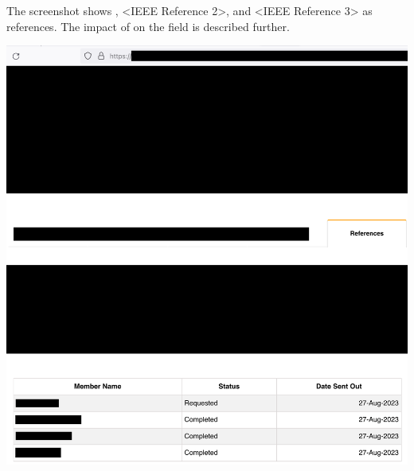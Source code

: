 
The screenshot shows \MrIeeeReferenceOne, <IEEE Reference 2>, and <IEEE Reference 3> as references.
The impact of \MrIeeeReferenceOne on the field is described further.

\begin{center}
    \includegraphics[width=\textwidth]{references_public}
\end{center}

\pagebreak
